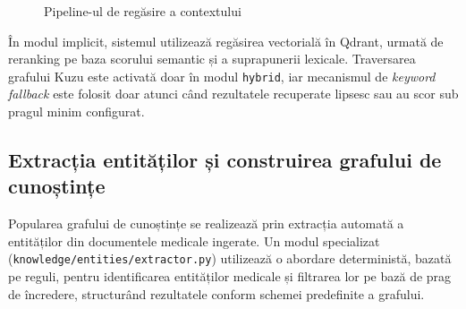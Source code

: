 \documentclass[12pt, a4paper, oneside, romanian]{teza-upb}
\begin{document}
\begin{figure}[H]
\centering
{}
\caption{Pipeline-ul de regăsire a contextului}
\label{fig:rag-retrieval}
\end{figure}

În modul implicit, sistemul utilizează regăsirea vectorială în Qdrant, urmată de reranking pe baza scorului semantic și a suprapunerii lexicale. Traversarea grafului Kuzu este activată doar în modul \texttt{hybrid}, iar mecanismul de \textit{keyword fallback} este folosit doar atunci când rezultatele recuperate lipsesc sau au scor sub pragul minim configurat.


\subsection{Extracția entităților și construirea grafului de cunoștințe}

Popularea grafului de cunoștințe se realizează prin extracția automată a entităților din documentele medicale ingerate. Un modul specializat (\texttt{knowledge/entities/extractor.py}) utilizează o abordare deterministă, bazată pe reguli, pentru identificarea entităților medicale și filtrarea lor pe bază de prag de încredere, structurând rezultatele conform schemei predefinite a grafului.
\end{document}
